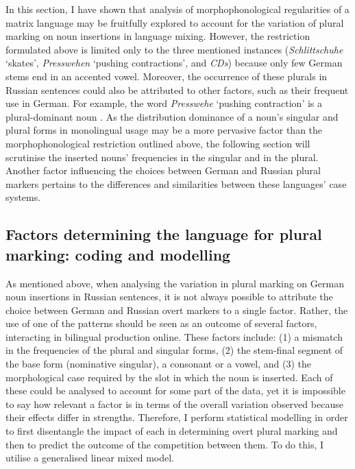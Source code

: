 In this section, I have shown that analysis of morphophonological regularities of a matrix language may be fruitfully explored to account for the variation of plural marking on noun insertions in language mixing. However, the restriction formulated above is limited only to the three mentioned instances (\textit{Schlittschuhe} `skates', \textit{Presswehen} `pushing contractions', and \textit{CDs}) because only few German stems end in an accented vowel. Moreover, the occurrence of these plurals in Russian sentences could also be attributed to other factors, such as their frequent use in German. For example, the word \textit{Presswehe} `pushing contraction' is a plural-dominant noun \citep{duden13}. As the distribution dominance of a noun's singular and plural forms in monolingual usage may be a more pervasive factor than the morphophonological restriction outlined above, the following section will scrutinise the inserted nouns' frequencies in the singular and in the plural. Another factor influencing the choices between German and Russian plural markers pertains to the differences and similarities between these languages’ case systems.

\subsection{Factors determining the language for plural marking: coding and modelling}\label{factors}

As mentioned above, when analysing the variation in plural marking on German noun insertions in Russian sentences, it is not always possible to attribute the choice between German and Russian overt markers to a single factor. Rather, the use of one of the patterns should be seen as an outcome of several factors, interacting in bilingual production online. These factors include: (1) a mismatch in the frequencies of the plural and singular forms, (2) the stem-final segment of the base form (nominative singular), a consonant or a vowel, and (3) the morphological case required by the slot in which the noun is inserted. Each of these could be analysed to account for some part of the data, yet it is impossible to say how relevant a factor is in terms of the overall variation observed because their effects differ in strengths. Therefore, I perform statistical modelling in order to first disentangle the impact of each in determining overt plural marking and then to predict the outcome of the competition between them. To do this, I utilise a generalised linear mixed model.

